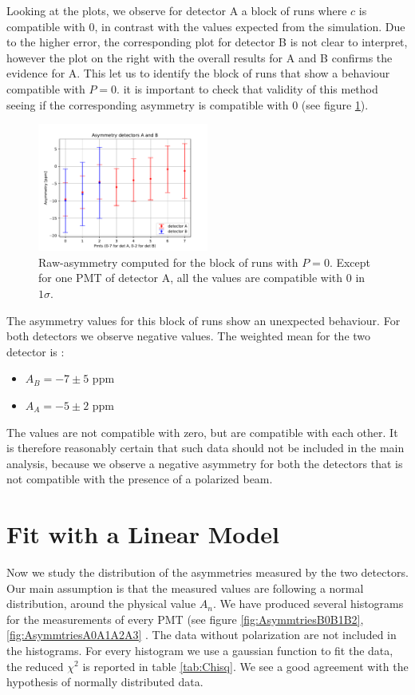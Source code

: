 Looking at the plots, we observe for detector A a block of runs where $c$ is compatible with 0, in contrast with the values expected from the simulation. Due to the higher error, the corresponding plot for detector B is not clear to interpret, however the plot on the right with the overall results for A and B confirms the evidence for A.
This let us to identify the block of runs that show a behaviour compatible with $P = 0$. it is important to check that validity of this method seeing if the corresponding asymmetry is compatible with $0$ (see figure \ref{fig:ZeroAsym}).

\begin{figure}[hbtp]
\centering
\includegraphics[width= 0.5\textwidth]{Analysis/Dataselection/Nopolarity.pdf}
\caption{Raw-asymmetry computed for the block of runs with $P = 0$. Except for one PMT of detector A, all the values are compatible with $0$ in $1\sigma$.}
\label{fig:ZeroAsym}
\end{figure}

The asymmetry values for this block of runs show an unexpected behaviour. For both detectors we observe negative values. The weighted mean for the two detector is :
\begin{itemize}
\item $A_{B} = -7 \pm 5$ ppm
\item $A_{A} = -5 \pm 2$ ppm
\end{itemize}

The values are not compatible with zero, but are compatible with each other. It is therefore reasonably certain that such data should not be included in the main analysis, because we observe a negative asymmetry for both the detectors that is not compatible with the presence of a polarized beam.

\section{Fit with a Linear Model}

Now we study the distribution of the asymmetries measured by the two detectors. Our main assumption is that the measured values are following a normal distribution, around the physical value $A_{n}$. We have produced several histograms for the measurements of every PMT (see figure \ref{fig:AsymmtriesB0B1B2},\ref{fig:AsymmtriesA0A1A2A3} . The data without polarization are not included in the histograms. For every histogram we use a gaussian function to fit the data, the reduced $\chi^{2}$ is reported in table \ref{tab:Chisq}. We see a good agreement with the hypothesis of normally distributed data.

